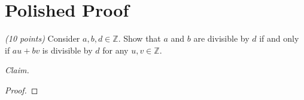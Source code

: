 \documentclass[12pt]{article}
\newcommand{\Z}{\mathbb{Z}}
\begin{document}
\section*{Polished Proof}

\emph{(10 points)} Consider $a, b, d \in \Z$. Show that $a$ and $b$ are divisible by $d$ if and only if $a u + b v$ is divisible by $d$ for any $u, v \in \Z$. \newline

\noindent \emph{Claim.}

\begin{proof}
\end{proof}
\end{document}
